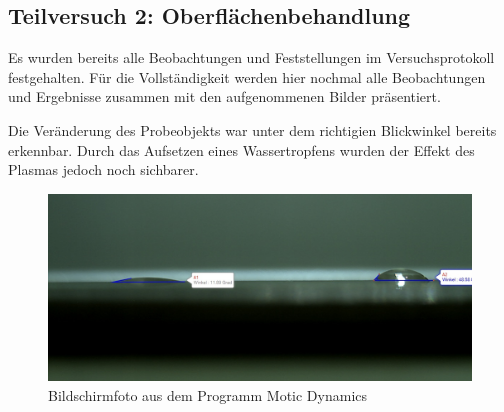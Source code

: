 \documentclass{article}
\newcommand{\widespace}{\enspace}
\newcommand{\wideeq}{\widespace = \widespace}
\newcommand{\coderef}[1]{%
    \text{\footnotesize \colorbox{codebg}{\texttt{#1()}}}%
}
\begin{document}


\newpage

\subsection{Teilversuch 2: Oberflächenbehandlung}

Es wurden bereits alle Beobachtungen und Feststellungen im Versuchsprotokoll festgehalten. Für die Vollständigkeit werden hier nochmal alle Beobachtungen und Ergebnisse zusammen mit den aufgenommenen Bilder präsentiert.

Die Veränderung des Probeobjekts war unter dem richtigien Blickwinkel bereits erkennbar. Durch das Aufsetzen eines Wassertropfens wurden der Effekt des Plasmas jedoch noch sichbarer.

\begin{figure}[H]
    \centering
    \includegraphics[width=0.7\linewidth]{Abbildungen/Wassertropfen.jpeg}
    \caption{Bildschirmfoto aus dem Programm Motic Dynamics}
    \label{graph_tv1}
\end{figure}
\end{document}
